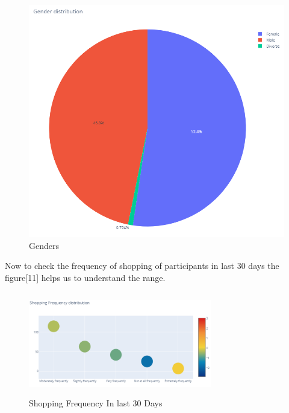 \documentclass[letterpaper, 10 pt, conference]{ieeeconf}
\begin{document}
\begin{figure}[!ht]
    \centering
    \includegraphics[scale = 0.3]{Picture10.png}
    \caption{Genders}
\end{figure}

Now to check the frequency of shopping of participants in last 30 days the figure[11] helps us to understand the range. %


\begin{figure}[!ht]
    \centering
    \includegraphics[width = 8cm, height = 4.5cm]{Picture11.png}
    \caption{Shopping Frequency In last 30 Days}
\end{figure}
\end{document}
